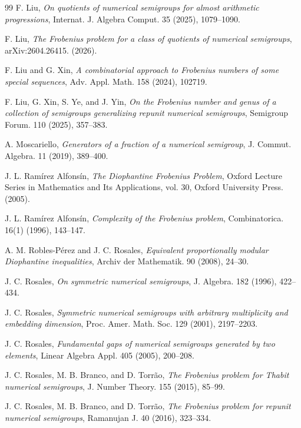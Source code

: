 \documentclass[reqno, 12pt]{article}
\numberwithin{equation}{section}
\theoremstyle{definition}
\begin{document}
\begin{thebibliography}{99}
 F. Liu, \emph{On quotients of numerical semigroups for almost arithmetic progressions}, Internat. J. Algebra Comput. 35 (2025), 1079--1090.

 F. Liu, \emph{The Frobenius problem for a class of quotients of numerical semigroups}, arXiv:2604.26415. (2026).

 F. Liu and G. Xin, \emph{A combinatorial approach to Frobenius numbers of some special sequences}, Adv. Appl. Math. 158 (2024), 102719.

 F. Liu, G. Xin, S. Ye, and J. Yin, \emph{On the Frobenius number and genus of a collection of semigroups generalizing repunit numerical semigroups}, Semigroup Forum. 110 (2025), 357--383.

 A. Moscariello, \emph{Generators of a fraction of a numerical semigroup}, J. Commut. Algebra. 11 (2019), 389--400.

 J. L. Ram\'irez Alfons\'in, \emph{The Diophantine Frobenius Problem}, Oxford Lecture Series in Mathematics and Its Applications, vol. 30, Oxford University Press. (2005).

 J. L. Ram\'irez Alfons\'in, \emph{Complexity of the Frobenius problem}, Combinatorica. 16(1) (1996), 143--147.

 A. M. Robles-P\'erez and J. C. Rosales, \emph{Equivalent proportionally modular Diophantine inequalities}, Archiv der Mathematik. 90 (2008), 24--30.

 J. C. Rosales, \emph{On symmetric numerical semigroups}, J. Algebra. 182 (1996), 422--434.


 J. C. Rosales, \emph{Symmetric numerical semigroups with arbitrary multiplicity and embedding dimension}, Proc. Amer. Math. Soc. 129 (2001), 2197--2203.


 J. C. Rosales, \emph{Fundamental gaps of numerical semigroups generated by two elements}, Linear Algebra Appl. 405 (2005), 200--208.

 J. C. Rosales, M. B. Branco, and D. Torr\~ao, \emph{The Frobenius problem for Thabit numerical semigroups}, J. Number Theory. 155 (2015), 85--99.

 J. C. Rosales, M. B. Branco, and D. Torr\~ao, \emph{The Frobenius problem for repunit numerical semigroups},  Ramanujan J. 40 (2016), 323--334.


\end{thebibliography}
\end{document}
